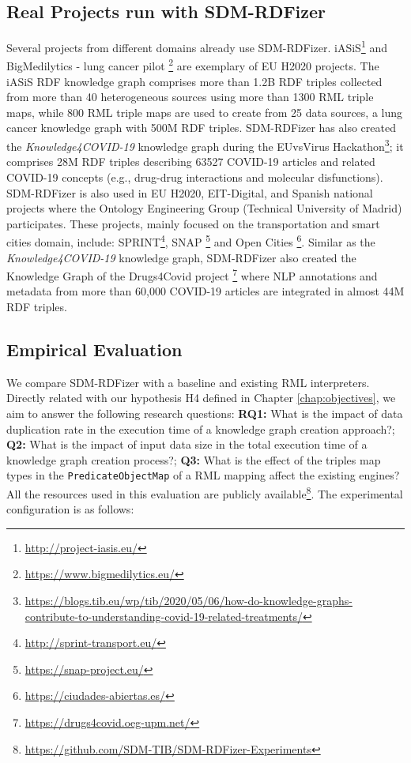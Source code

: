 \subsection{Real Projects run with SDM-RDFizer}


Several projects from different domains already use SDM-RDFizer.
iASiS\footnote{\url{http://project-iasis.eu/}} and BigMedilytics - lung cancer pilot \footnote{\url{https://www.bigmedilytics.eu/}} are exemplary of EU H2020 projects.
The iASiS RDF knowledge graph comprises more than 1.2B RDF triples collected from more than 40 heterogeneous sources using more than 1300 RML triple maps, while 800 RML triple maps are used to create from 25 data sources, a lung cancer knowledge graph with 500M RDF triples. SDM-RDFizer has also created the \textit{Knowledge4COVID-19} knowledge graph during the EUvsVirus Hackathon\footnote{\url{https://blogs.tib.eu/wp/tib/2020/05/06/how-do-knowledge-graphs-contribute-to-understanding-covid-19-related-treatments/}}; it comprises 28M RDF triples describing 63527 COVID-19 articles and related COVID-19 concepts (e.g., drug-drug interactions and molecular disfunctions). SDM-RDFizer is also used in EU H2020, EIT-Digital, and Spanish national projects where the Ontology Engineering Group (Technical University of Madrid) participates. These projects, mainly focused on the transportation and smart cities domain, include: SPRINT\footnote{\url{http://sprint-transport.eu/}}, SNAP \footnote{\url{https://snap-project.eu/}} and Open Cities \footnote{\url{https://ciudades-abiertas.es/}}. Similar as the \textit{Knowledge4COVID-19} knowledge graph, SDM-RDFizer also created the Knowledge Graph of the Drugs4Covid project \footnote{\url{https://drugs4covid.oeg-upm.net/}} where NLP annotations and metadata from more than 60,000 COVID-19 articles are integrated in almost 44M RDF triples.

\subsection{Empirical Evaluation}

We compare SDM-RDFizer with a baseline and existing RML interpreters. Directly related with our hypothesis H4 defined in Chapter \ref{chap:objectives},  we aim to answer the following research questions: \textbf{RQ1:} What is the impact of data duplication rate in the execution time of a knowledge graph creation approach?; \textbf{Q2:} What is the impact of input data size in the total execution time of a knowledge graph creation process?; \textbf{Q3:} What is the effect of the triples map types in the \verb|PredicateObjectMap| of a RML mapping affect the existing engines? All the resources used in this evaluation are publicly available\footnote{\url{https://github.com/SDM-TIB/SDM-RDFizer-Experiments}}. The experimental configuration is as follows:

